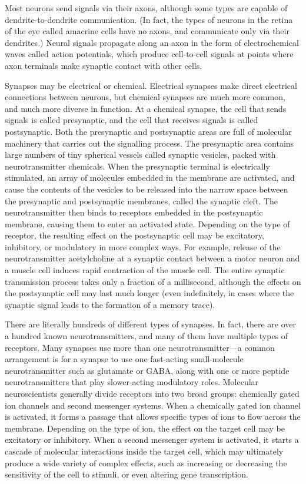 Most neurons send signals via their axons, although some types are capable of dendrite-to-dendrite communication. (In fact, the types of neurons in the retina of the eye called amacrine cells have no axons, and communicate only via their dendrites.) Neural signals propagate along an axon in the form of electrochemical waves called action potentials, which produce cell-to-cell signals at points where axon terminals make synaptic contact with other cells.

Synapses may be electrical or chemical. Electrical synapses make direct electrical connections between neurons, but chemical synapses are much more common, and much more diverse in function. At a chemical synapse, the cell that sends signals is called presynaptic, and the cell that receives signals is called postsynaptic. Both the presynaptic and postsynaptic areas are full of molecular machinery that carries out the signalling process. The presynaptic area contains large numbers of tiny spherical vessels called synaptic vesicles, packed with neurotransmitter chemicals. When the presynaptic terminal is electrically stimulated, an array of molecules embedded in the membrane are activated, and cause the contents of the vesicles to be released into the narrow space between the presynaptic and postsynaptic membranes, called the synaptic cleft. The neurotransmitter then binds to receptors embedded in the postsynaptic membrane, causing them to enter an activated state. Depending on the type of receptor, the resulting effect on the postsynaptic cell may be excitatory, inhibitory, or modulatory in more complex ways. For example, release of the neurotransmitter acetylcholine at a synaptic contact between a motor neuron and a muscle cell induces rapid contraction of the muscle cell. The entire synaptic transmission process takes only a fraction of a millisecond, although the effects on the postsynaptic cell may last much longer (even indefinitely, in cases where the synaptic signal leads to the formation of a memory trace).

There are literally hundreds of different types of synapses. In fact, there are over a hundred known neurotransmitters, and many of them have multiple types of receptors. Many synapses use more than one neurotransmitter---a common arrangement is for a synapse to use one fast-acting small-molecule neurotransmitter such as glutamate or GABA, along with one or more peptide neurotransmitters that play slower-acting modulatory roles. Molecular neuroscientists generally divide receptors into two broad groups: chemically gated ion channels and second messenger systems. When a chemically gated ion channel is activated, it forms a passage that allows specific types of ions to flow across the membrane. Depending on the type of ion, the effect on the target cell may be excitatory or inhibitory. When a second messenger system is activated, it starts a cascade of molecular interactions inside the target cell, which may ultimately produce a wide variety of complex effects, such as increasing or decreasing the sensitivity of the cell to stimuli, or even altering gene transcription.

